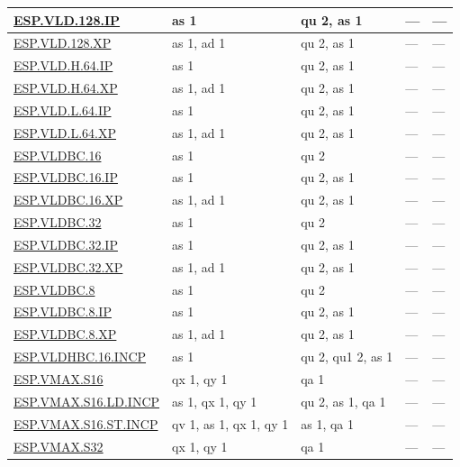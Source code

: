 \begin{longtable}[c]{|l|m{2.5cm}|m{2.5cm}|m{2.5cm}|m{2.5cm}|}
    \hyperref[instruction:ESPVLD128IP]{ESP.VLD.128.IP} & as 1 & qu 2, as 1 & — & — \\\hline
    \hyperref[instruction:ESPVLD128XP]{ESP.VLD.128.XP} & as 1, ad 1 & qu 2, as 1 & — & — \\\hline
    \hyperref[instruction:ESPVLDH64IP]{ESP.VLD.H.64.IP} & as 1 & qu 2, as 1 & — & — \\\hline
    \hyperref[instruction:ESPVLDH64XP]{ESP.VLD.H.64.XP} & as 1, ad 1 & qu 2, as 1 & — & — \\\hline
    \hyperref[instruction:ESPVLDL64IP]{ESP.VLD.L.64.IP} & as 1 & qu 2, as 1 & — & — \\\hline
    \hyperref[instruction:ESPVLDL64XP]{ESP.VLD.L.64.XP} & as 1, ad 1 & qu 2, as 1 & — & — \\\hline
    \hyperref[instruction:ESPVLDBC16]{ESP.VLDBC.16} & as 1 & qu 2 & — & — \\\hline
    \hyperref[instruction:ESPVLDBC16IP]{ESP.VLDBC.16.IP} & as 1 & qu 2, as 1 & — & — \\\hline
    \hyperref[instruction:ESPVLDBC16XP]{ESP.VLDBC.16.XP} & as 1, ad 1 & qu 2, as 1 & — & — \\\hline
    \hyperref[instruction:ESPVLDBC32]{ESP.VLDBC.32} & as 1 & qu 2 & — & — \\\hline
    \hyperref[instruction:ESPVLDBC32IP]{ESP.VLDBC.32.IP} & as 1 & qu 2, as 1 & — & — \\\hline
    \hyperref[instruction:ESPVLDBC32XP]{ESP.VLDBC.32.XP} & as 1, ad 1 & qu 2, as 1 & — & — \\\hline
    \hyperref[instruction:ESPVLDBC8]{ESP.VLDBC.8} & as 1 & qu 2 & — & — \\\hline
    \hyperref[instruction:ESPVLDBC8IP]{ESP.VLDBC.8.IP} & as 1 & qu 2, as 1 & — & — \\\hline
    \hyperref[instruction:ESPVLDBC8XP]{ESP.VLDBC.8.XP} & as 1, ad 1 & qu 2, as 1 & — & — \\\hline
    \hyperref[instruction:ESPVLDHBC16INCP]{ESP.VLDHBC.16.INCP} & as 1 & qu 2, qu1 2, as 1 & — & — \\\hline
    \hyperref[instruction:ESPVMAXS16]{ESP.VMAX.S16} & qx 1, qy 1 & qa 1 & — & — \\\hline
    \hyperref[instruction:ESPVMAXS16LDINCP]{ESP.VMAX.S16.LD.INCP} & as 1, qx 1, qy 1 & qu 2, as 1, qa 1 & — & — \\\hline
    \hyperref[instruction:ESPVMAXS16STINCP]{ESP.VMAX.S16.ST.INCP} & qv 1, as 1, qx 1, qy 1 & as 1, qa 1 & — & — \\\hline
    \hyperref[instruction:ESPVMAXS32]{ESP.VMAX.S32} & qx 1, qy 1 & qa 1 & — & — \\\hline

\end{longtable}
